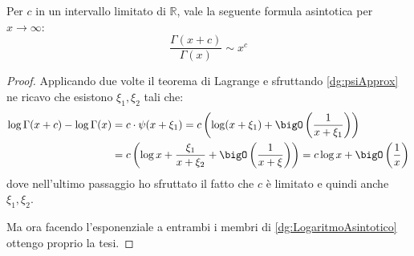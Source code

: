 \begin{corollary}\label{dg:RapportoAsint}
	Per $c$ in un intervallo limitato di $\mathbb{R}$, vale la seguente formula asintotica per $x\to\infty$:
	\begin{equation}
		\frac{\Gamma(x+c)}{\Gamma(x)}\sim x^c
	\end{equation}
\end{corollary}
\begin{proof}
	Applicando due volte il teorema di Lagrange e sfruttando \cref{dg:psiApprox} ne ricavo che esistono $\xi_1,\xi_2$ tali che:
	\begin{equation}\label{dg:LogaritmoAsintotico}\begin{split}
		\log\Gamma(x+c)-\log\Gamma(x)&=c\cdot\psi(x+\xi_1)=c\left(\log(x+\xi_1)+\bigO\left(\frac 1{x+\xi_1}\right)\right)\\
		&=c\left(\log x+\frac{\xi_1}{x+\xi_2}+\bigO\left(\frac 1{x+\xi}\right)\right)=c\log x+\bigO\left(\frac1{x}\right)
	\end{split}\end{equation}
	dove nell'ultimo passaggio ho sfruttato il fatto che $c$ è limitato e quindi anche $\xi_1,\xi_2$.

	Ma ora facendo l'esponenziale a entrambi i membri di \cref{dg:LogaritmoAsintotico} ottengo proprio la tesi.
\end{proof}








